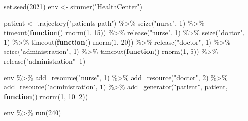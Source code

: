 \documentclass[
]{book}
\newenvironment{Shaded}{\begin{snugshade}}{\end{snugshade}}
\newcommand{\ControlFlowTok}[1]{\textcolor[rgb]{0.13,0.29,0.53}{\textbf{#1}}}
\newcommand{\DecValTok}[1]{\textcolor[rgb]{0.00,0.00,0.81}{#1}}
\newcommand{\FunctionTok}[1]{\textcolor[rgb]{0.00,0.00,0.00}{#1}}
\newcommand{\NormalTok}[1]{#1}
\newcommand{\OtherTok}[1]{\textcolor[rgb]{0.56,0.35,0.01}{#1}}
\newcommand{\SpecialCharTok}[1]{\textcolor[rgb]{0.00,0.00,0.00}{#1}}
\newcommand{\StringTok}[1]{\textcolor[rgb]{0.31,0.60,0.02}{#1}}
\begin{document}
\begin{Shaded}
\begin{Highlighting}[]
\FunctionTok{set.seed}\NormalTok{(}\DecValTok{2021}\NormalTok{)}
\NormalTok{env }\OtherTok{\textless{}{-}} \FunctionTok{simmer}\NormalTok{(}\StringTok{"HealthCenter"}\NormalTok{)}

\NormalTok{patient }\OtherTok{\textless{}{-}} \FunctionTok{trajectory}\NormalTok{(}\StringTok{"patients\textquotesingle{} path"}\NormalTok{) }\SpecialCharTok{\%\textgreater{}\%}
  \FunctionTok{seize}\NormalTok{(}\StringTok{"nurse"}\NormalTok{, }\DecValTok{1}\NormalTok{) }\SpecialCharTok{\%\textgreater{}\%}
  \FunctionTok{timeout}\NormalTok{(}\ControlFlowTok{function}\NormalTok{() }\FunctionTok{rnorm}\NormalTok{(}\DecValTok{1}\NormalTok{, }\DecValTok{15}\NormalTok{)) }\SpecialCharTok{\%\textgreater{}\%}
  \FunctionTok{release}\NormalTok{(}\StringTok{"nurse"}\NormalTok{, }\DecValTok{1}\NormalTok{) }\SpecialCharTok{\%\textgreater{}\%}
  \FunctionTok{seize}\NormalTok{(}\StringTok{"doctor"}\NormalTok{, }\DecValTok{1}\NormalTok{) }\SpecialCharTok{\%\textgreater{}\%}
  \FunctionTok{timeout}\NormalTok{(}\ControlFlowTok{function}\NormalTok{() }\FunctionTok{rnorm}\NormalTok{(}\DecValTok{1}\NormalTok{, }\DecValTok{20}\NormalTok{)) }\SpecialCharTok{\%\textgreater{}\%}
  \FunctionTok{release}\NormalTok{(}\StringTok{"doctor"}\NormalTok{, }\DecValTok{1}\NormalTok{) }\SpecialCharTok{\%\textgreater{}\%}
  \FunctionTok{seize}\NormalTok{(}\StringTok{"administration"}\NormalTok{, }\DecValTok{1}\NormalTok{) }\SpecialCharTok{\%\textgreater{}\%}
  \FunctionTok{timeout}\NormalTok{(}\ControlFlowTok{function}\NormalTok{() }\FunctionTok{rnorm}\NormalTok{(}\DecValTok{1}\NormalTok{, }\DecValTok{5}\NormalTok{)) }\SpecialCharTok{\%\textgreater{}\%}
  \FunctionTok{release}\NormalTok{(}\StringTok{"administration"}\NormalTok{, }\DecValTok{1}\NormalTok{)}

\NormalTok{env }\SpecialCharTok{\%\textgreater{}\%}
  \FunctionTok{add\_resource}\NormalTok{(}\StringTok{"nurse"}\NormalTok{, }\DecValTok{1}\NormalTok{) }\SpecialCharTok{\%\textgreater{}\%}
  \FunctionTok{add\_resource}\NormalTok{(}\StringTok{"doctor"}\NormalTok{, }\DecValTok{2}\NormalTok{) }\SpecialCharTok{\%\textgreater{}\%}
  \FunctionTok{add\_resource}\NormalTok{(}\StringTok{"administration"}\NormalTok{, }\DecValTok{1}\NormalTok{) }\SpecialCharTok{\%\textgreater{}\%}
  \FunctionTok{add\_generator}\NormalTok{(}\StringTok{"patient"}\NormalTok{, patient, }\ControlFlowTok{function}\NormalTok{() }\FunctionTok{rnorm}\NormalTok{(}\DecValTok{1}\NormalTok{, }\DecValTok{10}\NormalTok{, }\DecValTok{2}\NormalTok{))}

\NormalTok{env }\SpecialCharTok{\%\textgreater{}\%} \FunctionTok{run}\NormalTok{(}\DecValTok{240}\NormalTok{)}
\end{Highlighting}
\end{Shaded}
\end{document}
